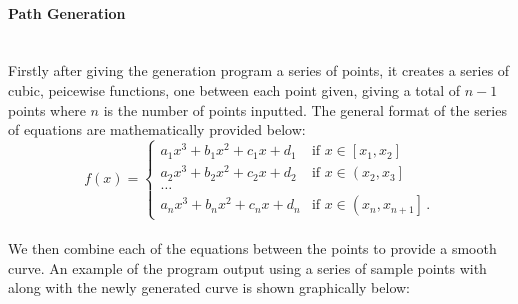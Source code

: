 \documentclass[a4paper,12pt]{article}
\begin{document}
\hspace{-0.65cm}\paragraph{Path Generation}\mbox{}\\
 Firstly after giving the generation program a series of points, it creates a series of cubic, peicewise functions, one between each point given, giving a total of $n-1$ points where $n$ is the number of points inputted. The general format of the series of equations are mathematically provided below:
\begin{equation}
    f\left(x\right)=\begin{cases} 
a_1x^3+b_1x^2+c_1x+d_1&\text{if }x\in\left[x_1,x_2\right]\\ 
a_2x^3+b_2x^2+c_2x+d_2&\text{if }x\in\left(x_2,x_3\right]\\ 
\dots\\ 
a_nx^3+b_nx^2+c_nx+d_n&\text{if }x\in\left(x_{n},x_{n+1}\right]\,. 
\end{cases}
\end{equation}
\\
We then combine each of the equations between the points to provide a smooth curve. An example of the program output using a series of sample points with along with the newly generated curve is shown graphically below:
\\
\\
\end{document}
